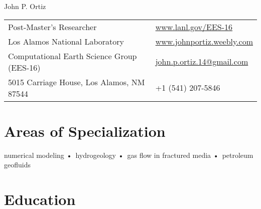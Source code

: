 \documentclass[11pt, letterpaper]{article}
\def\doubleline{

	\vspace{-1.4em}
	\hspace{\fill}\linethickness{0.7pt}\line(1,0){5.5in}\hspace{\fill}
	
	\vspace{-1.0em}
	\hspace{\fill}\linethickness{0.7pt}\line(1,0){5.5in}\hspace{\fill}
	
}
\begin{document}
{\LARGE John P. Ortiz} %




\begin{center}
	\begin{tabular}{l l}
		Post-Master's Researcher    & \hspace{.5in}\href{www.lanl.gov/EES-16}{www.lanl.gov/EES-16} \\
		Los Alamos National Laboratory   & \hspace{.5in}\href{http://johnportiz.weebly.com/}{www.johnportiz.weebly.com}   \\
		Computational Earth Science Group (EES-16)       & \hspace{.5in}\Letter {     } \href{mailto:john.p.ortiz.14@gmail.com}{john.p.ortiz.14@gmail.com}    \\ 
		5015 Carriage House,   Los Alamos, NM 87544 & \hspace{.5in}\Mobilefone { } +1 (541) 207-5846  \\
		
	\end{tabular}
\end{center}


\section*{Areas of Specialization}
	numerical modeling •\ hydrogeology •\ gas flow in fractured media •\ petroleum geofluids
	

\section*{Education}
\noindent
\end{document}
